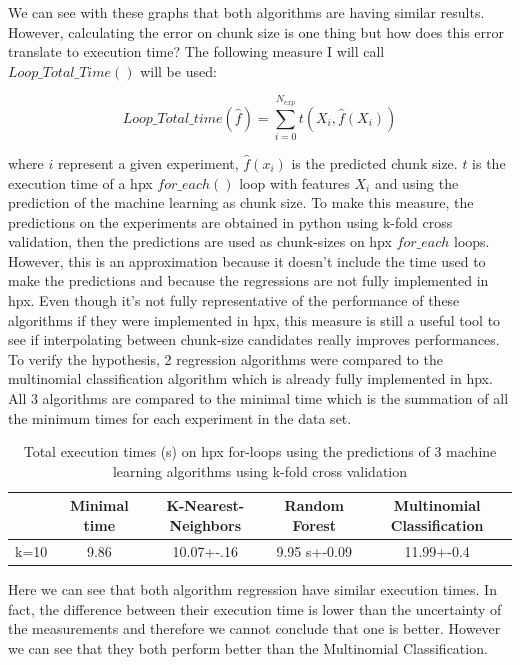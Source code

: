 We can see with these graphs that both algorithms are having similar results. However, calculating the error on chunk size is one thing but how does this error translate to execution time? The following measure I will call $Loop\_Total\_Time()$ will be used:

$$Loop\_Total\_time(\hat{f})=\sum_{i=0}^{N_{exp}} t(X_i,\hat{f}(X_i))$$

where $i$ represent a given experiment, $\hat{f}(x_i)$ is the predicted chunk size. $t$ is the execution time of a hpx $for\_each()$ loop with features $X_i$ and using the prediction of the machine learning as chunk size. To make this measure, the predictions on the experiments are obtained in python using k-fold cross validation, then the predictions are used as chunk-sizes on hpx $for\_each$ loops. However, this is an approximation because it doesn't include the time used to make the predictions and because the regressions are not fully implemented in hpx. Even though it's not fully representative of the performance of these algorithms if they were implemented in hpx, this measure is still a useful tool to see if interpolating between chunk-size candidates really improves performances. To verify the hypothesis, 2 regression algorithms were compared to the multinomial classification algorithm which is already fully implemented in hpx. All 3 algorithms are compared to the minimal time which is the summation of all the minimum times for each experiment in the data set.

\begin{table}[h]
	\centering
	\caption{Total execution times (s) on hpx for-loops using the predictions of 3 machine learning algorithms using k-fold cross validation}
	\label{my-label}
	\begin{tabular}{|c|c|c|c|c|}
		\hline
		& Minimal time &K-Nearest-Neighbors & Random Forest &Multinomial Classification\\ \hline
		k=10 & 9.86
		&10.07+-.16  & 9.95 s+-0.09 & 11.99+-0.4\\ \hline
	\end{tabular}
\end{table}

Here we can see that both algorithm regression have similar execution times. In fact, the difference between their execution time is lower than the uncertainty of the measurements and therefore we cannot conclude that one is better. However we can see that they both perform better than the Multinomial Classification. 

